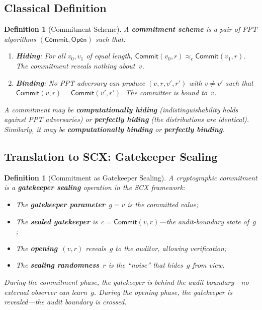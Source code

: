 \documentclass[12pt,a4paper]{article}
\newtheorem{definition}[theorem]{Definition}
\theoremstyle{remark}
\newcommand{\SCX}{\textsf{SCX}}
\newcommand{\Commit}{\textsf{Commit}}
\newcommand{\Open}{\textsf{Open}}
\begin{document}
\subsection{Classical Definition}

\begin{definition}[Commitment Scheme]
\label{def:commitment}
A \textbf{commitment scheme} is a pair of PPT algorithms $(\Commit, \Open)$ such that:
\begin{enumerate}[leftmargin=*, label=(\roman*)]
  \item \textbf{Hiding}: For all $v_0, v_1$ of equal length, $\Commit(v_0, r) \approx_c \Commit(v_1, r)$. The commitment reveals nothing about~$v$.
  \item \textbf{Binding}: No PPT adversary can produce $(v, r, v', r')$ with $v \neq v'$ such that $\Commit(v, r) = \Commit(v', r')$. The committer is bound to~$v$.
\end{enumerate}
A commitment may be \textbf{computationally hiding} (indistinguishability holds against PPT adversaries) or \textbf{perfectly hiding} (the distributions are identical). Similarly, it may be \textbf{computationally binding} or \textbf{perfectly binding}.
\end{definition}

\subsection{Translation to SCX: Gatekeeper Sealing}

\begin{definition}[Commitment as Gatekeeper Sealing]
\label{def:commit_sealing}
A cryptographic commitment is a \textbf{gatekeeper sealing} operation in the \SCX{} framework:
\begin{itemize}[leftmargin=*]
  \item The \textbf{gatekeeper parameter}~$g = v$ is the committed value;
  \item The \textbf{sealed gatekeeper} is~$c = \Commit(v, r)$---the audit-boundary state of~$g$;
  \item The \textbf{opening}~$(v, r)$ reveals~$g$ to the auditor, allowing verification;
  \item The \textbf{sealing randomness}~$r$ is the ``noise'' that hides~$g$ from view.
\end{itemize}
During the commitment phase, the gatekeeper is behind the audit boundary---no external observer can learn~$g$. During the opening phase, the gatekeeper is revealed---the audit boundary is crossed.
\end{definition}
\end{document}
